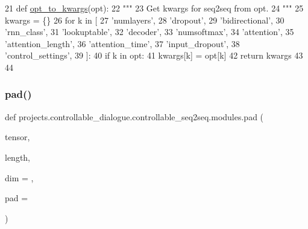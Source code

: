 \begin{DoxyCode}
21 \textcolor{keyword}{def }\hyperlink{namespaceprojects_1_1controllable__dialogue_1_1controllable__seq2seq_1_1modules_a29bd74b29a327dc6c2d4a3aaa9ec3c08}{opt\_to\_kwargs}(opt):
22     \textcolor{stringliteral}{"""}
23 \textcolor{stringliteral}{    Get kwargs for seq2seq from opt.}
24 \textcolor{stringliteral}{    """}
25     kwargs = \{\}
26     \textcolor{keywordflow}{for} k \textcolor{keywordflow}{in} [
27         \textcolor{stringliteral}{'numlayers'},
28         \textcolor{stringliteral}{'dropout'},
29         \textcolor{stringliteral}{'bidirectional'},
30         \textcolor{stringliteral}{'rnn\_class'},
31         \textcolor{stringliteral}{'lookuptable'},
32         \textcolor{stringliteral}{'decoder'},
33         \textcolor{stringliteral}{'numsoftmax'},
34         \textcolor{stringliteral}{'attention'},
35         \textcolor{stringliteral}{'attention\_length'},
36         \textcolor{stringliteral}{'attention\_time'},
37         \textcolor{stringliteral}{'input\_dropout'},
38         \textcolor{stringliteral}{'control\_settings'},
39     ]:
40         \textcolor{keywordflow}{if} k \textcolor{keywordflow}{in} opt:
41             kwargs[k] = opt[k]
42     \textcolor{keywordflow}{return} kwargs
43 
44 
\end{DoxyCode}
\mbox{\label{namespaceprojects_1_1controllable__dialogue_1_1controllable__seq2seq_1_1modules_abdf83fbfd5a42f32b931c6fbae972dde}} 
\subsubsection{\texorpdfstring{pad()}{pad()}}
{\footnotesize\ttfamily def projects.\+controllable\+\_\+dialogue.\+controllable\+\_\+seq2seq.\+modules.\+pad (\begin{DoxyParamCaption}\item[{}]{tensor,  }\item[{}]{length,  }\item[{}]{dim = {},  }\item[{}]{pad = {} }\end{DoxyParamCaption})}

